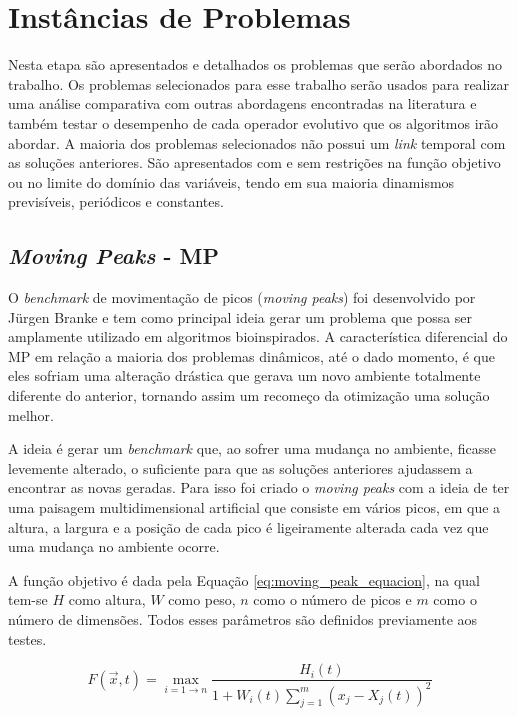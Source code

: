 \section{Instâncias de Problemas}
\label{sec:revisao_dinamic_problems}
Nesta etapa são apresentados e detalhados os problemas que serão abordados no trabalho. Os problemas selecionados para esse trabalho serão usados para realizar uma análise comparativa com outras abordagens encontradas na literatura e também testar o desempenho de cada operador evolutivo que os algoritmos irão abordar. A maioria dos problemas selecionados não possui um \textit{link} temporal com as soluções anteriores. São apresentados com e sem restrições na função objetivo ou no limite do domínio das variáveis, tendo em sua maioria dinamismos previsíveis, periódicos e constantes.

\subsection{\textit{Moving Peaks} - MP}
\label{sec:moving_peaks}

O \textit{benchmark} de movimentação de picos (\textit{moving peaks}) foi desenvolvido por Jürgen Branke \cite{moving_peak_1999} e tem como principal ideia gerar um problema que possa ser amplamente utilizado em algoritmos bioinspirados. A característica diferencial do MP em relação a maioria dos problemas dinâmicos, até o dado momento, é que eles sofriam uma alteração drástica que gerava um novo ambiente totalmente diferente do anterior, tornando assim um recomeço da otimização uma solução melhor.

A ideia é gerar um \textit{benchmark} que, ao sofrer uma mudança no ambiente, ficasse levemente alterado, o suficiente para que as soluções anteriores ajudassem a encontrar as novas geradas. Para isso foi criado o \textit{moving peaks} com a ideia de ter uma paisagem multidimensional artificial que consiste em vários picos, em que a altura, a largura e a posição de cada pico é ligeiramente alterada cada vez que uma mudança no ambiente ocorre.

A função objetivo é dada pela Equação \ref{eq:moving_peak_equacion}, na qual tem-se $ H $ como altura, $ W $ como peso, $ n $ como o número de picos e $ m $ como o número de dimensões. Todos esses parâmetros são definidos previamente aos testes.

\begin{equation}
\label{eq:moving_peak_equacion}
F(\vec{x},t) = \max_{i = 1 \to n} \frac {H_i(t)}{1 + W_i(t)\sum_{j=1}^{m} (x_j - X_j(t))^2}
\end{equation}

